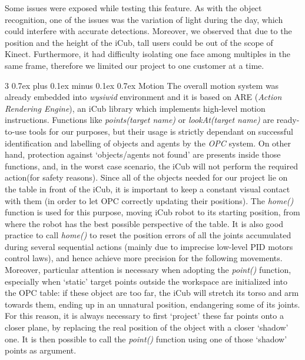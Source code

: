 \documentclass[conference]{IEEEtran}
\makeatletter
\def\subsubsection{\@startsection{subsubsection}%
	{3}%
	{\z@}%
	{0.7ex plus 0.1ex minus 0.1ex}%
	{0.7ex}%
	{\normalfont\normalsize\itshape}}%
\makeatother
\begin{document}
Some issues were exposed while testing this feature. As with the object recognition, one of the issues was the variation of light during the day, which could interfere with accurate detections. Moreover, we observed that due to the position and the height of the iCub, tall users could be out of the scope of Kinect. Furthermore, it had difficulty isolating one face among multiples in the same frame, therefore we limited our project to one customer at a time.

\subsubsection{Motion}
The overall motion system was already embedded into \textit{wysiwid} environment and it is based on ARE (\textit{Action Rendering Engine}), an iCub library which implements high-level motion instructions. Functions like \textit{points(target name)} or \textit{lookAt(target name)} are ready-to-use tools for our purposes, but their usage is strictly dependant on successful identification and labelling of objects and agents by the \textit{OPC} system. On other hand, protection against `objects/agents not found' are presents inside those functions, and, in the worst case scenario, the iCub will not perform the required action(for safety reasons). Since all of the objects needed for our project lie on the table in front of the iCub, it is important to keep a constant visual contact with them (in order to let OPC correctly updating their positions). The \textit{home()} function is used for this purpose, moving iCub robot to its starting position, from where the robot has the best possible perspective of the table. It is also good practice to call \textit{home()} to reset the position errors of all the joints accumulated during several sequential actions (mainly due to imprecise low-level PID motors control laws), and hence achieve more precision for the following movements. Moreover, particular attention is necessary when adopting the \textit{point()} function, especially when  `static' target points outside the workspace are initialized into the OPC table: if these object are too far, the iCub will stretch its torso and arm towards them, ending up in an unnatural position, endangering some of its joints. For this reason, it is always necessary to first `project' these far points onto a closer plane, by replacing the real position of the object with a closer `shadow' one. It is then possible to call the \textit{point()} function using one of those `shadow' points as argument.
\end{document}
